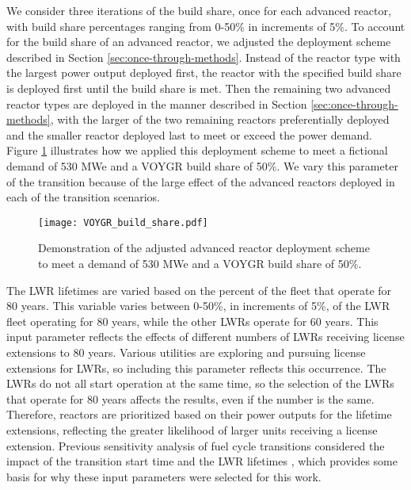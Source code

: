 We consider three 
iterations of the build share, once for each advanced reactor, with 
build share percentages ranging from 0-50\% 
in increments of 5\%. To account for the build share of an advanced reactor,
we adjusted the deployment scheme described in Section \ref{sec:once-through-methods}.
Instead of the reactor type with the largest power output 
deployed first, the reactor with the specified build share is deployed first 
until the build share is met. Then the remaining two advanced reactor types are 
deployed in the manner described in Section \ref{sec:once-through-methods},
with the larger of the two remaining reactors preferentially deployed and 
the smaller reactor deployed last to meet or exceed the power demand. Figure 
\ref{fig:build-share-deploy} illustrates how we applied this deployment 
scheme to meet a fictional demand of 530 MWe and a VOYGR build share of 
50\%. We vary this parameter of the transition because of the large effect 
of the advanced reactors deployed in each of the transition scenarios. 

\begin{figure}
    \centering 
    \texttt{[image: VOYGR\_build\_share.pdf]}
    \caption{Demonstration of the adjusted advanced reactor deployment 
    scheme to meet a demand of 530 MWe and a VOYGR build share of 
    50\%.}
    \label{fig:build-share-deploy}
\end{figure}

The \gls{LWR} lifetimes are varied based 
on the percent of the fleet that operate for 80 years. This 
variable varies between 0-50\%, in increments of 5\%, of the \gls{LWR} 
fleet operating for 80 
years, while the other \glspl{LWR} operate for 60 years. This input 
parameter reflects the effects of different numbers of \glspl{LWR} 
receiving license extensions to 80 years. Various utilities are exploring 
and pursuing license extensions for \glspl{LWR}, so including this parameter 
reflects this occurrence. The 
\glspl{LWR} do not all start operation at the same time, so the 
selection of the \glspl{LWR} that operate for 80 years affects the results, 
even if the number is the same. Therefore, reactors are prioritized based 
on their power outputs for the lifetime extensions, reflecting the greater likelihood of 
larger units receiving a license extension. Previous sensitivity analysis of 
fuel cycle transitions considered the impact of the transition start time 
and the \gls{LWR} lifetimes \cite{chee_sensitivity_2019,feng_sensitivity_2020},
which provides some basis for why these input parameters were selected for this 
work.

